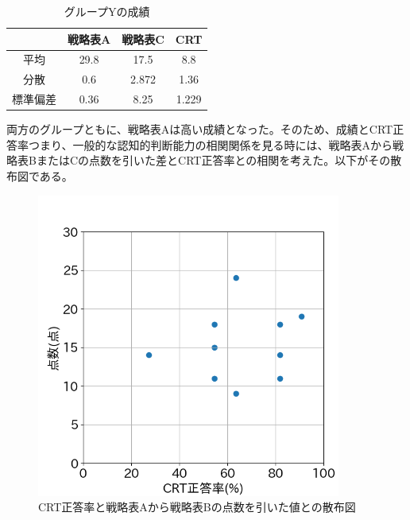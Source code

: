 \begin{table}[H]
    \begin{center}
    \caption{グループYの成績}
    \begin{tabular}{|c|c|c|c|}
    \hline
         & 戦略表A & 戦略表C  & CRT   \\ \hline
    平均   & 29.8 & 17.5  & 8.8   \\ \hline
    分散   & 0.6  & 2.872 & 1.36  \\ \hline
    標準偏差 & 0.36 & 8.25  & 1.229 \\ \hline
    \end{tabular}
    \end{center}
\end{table}
両方のグループともに、戦略表Aは高い成績となった。そのため、成績とCRT正答率つまり、一般的な認知的判断能力の相関関係を見る時には、戦略表Aから戦略表BまたはCの点数を引いた差とCRT正答率との相関を考えた。以下がその散布図である。
\begin{figure}[H]   
    \begin{center}
        \includegraphics[width=10cm]{figure/experiment-groupX_crt_diffAB.png}
        \caption{CRT正答率と戦略表Aから戦略表Bの点数を引いた値との散布図}
    \end{center}
\end{figure}

